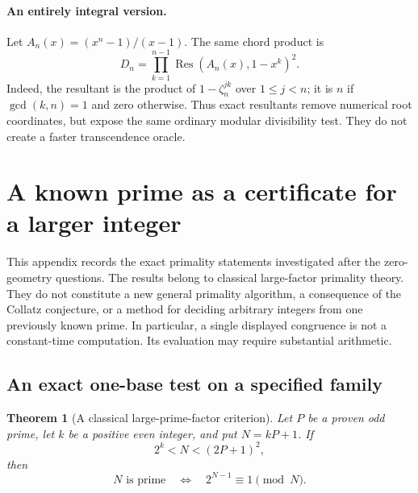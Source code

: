 \documentclass[11pt,a4paper]{article}
\newtheorem{theorem}{Theorem}[section]
\theoremstyle{definition}
\theoremstyle{remark}
\numberwithin{equation}{section}
\begin{document}

\paragraph{An entirely integral version.}
Let $A_n(x)=(x^n-1)/(x-1)$. The same chord product is
\[
 D_n=\prod_{k=1}^{n-1}\operatorname{Res}(A_n(x),1-x^k)^2.
\]
Indeed, the resultant is the product of $1-\zeta_n^{jk}$ over $1\le j<n$;
it is $n$ if $\gcd(k,n)=1$ and zero otherwise. Thus exact resultants
remove numerical root coordinates, but expose the same ordinary
modular divisibility test. They do not create a faster transcendence
oracle.


\section{A known prime as a certificate for a larger integer}
\label{C:sec:seed-primality}

This appendix records the exact primality statements investigated after
the zero-geometry questions. The results belong to classical
large-factor primality theory. They do not constitute a new general
primality algorithm, a consequence of the Collatz conjecture, or a
method for deciding arbitrary integers from one previously known prime.
In particular, a single displayed congruence is not a constant-time
computation. Its evaluation may require substantial arithmetic.

\subsection{An exact one-base test on a specified family}

\begin{theorem}[A classical large-prime-factor criterion]
\label{C:thm:seed-one-base}
Let $P$ be a proven odd prime, let $k$ be a positive even integer, and
put $N=kP+1$. If
\begin{equation}
  2^k<N<(2P+1)^2,
  \label{C:eq:seed-range}
\end{equation}
then
\begin{equation}
  N\text{ is prime}
  \quad\Longleftrightarrow\quad
  2^{N-1}\equiv1\pmod N.
  \label{C:eq:seed-iff}
\end{equation}
\end{theorem}
\end{document}
